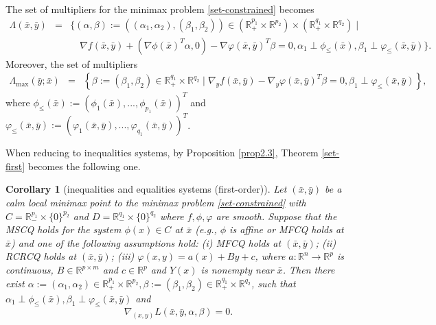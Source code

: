 \documentclass[11pt]{article}
\numberwithin{equation}{section}
\newtheorem{corollary}{Corollary}[section]
\begin{document}
{The set of multipliers for the minimax problem \eqref{set-constrained} becomes
\begin{eqnarray*}
 \Lambda(\bar x,\bar y) &=&  \{ (\alpha,\beta):=((\alpha_1,\alpha_2),(\beta_1,\beta_2)) \in (\mathbb{R}^{p_1}_+ \times \mathbb{R}^{p_2}) \times (\mathbb{R}^{q_1}_+ \times \mathbb{R}^{q_2}) \mid   \\
& & \quad \nabla f(\bar x,\bar y)+(\nabla \phi(\bar x)^T\alpha, 0)- \nabla \varphi(\bar x,\bar y)^T\beta=0, \alpha_1 \perp \phi_{\leq}(\bar x) ,\beta_1 \perp \varphi_{\leq}(\bar x,\bar y)  \}.
\end{eqnarray*}
Moreover, the set of multipliers
\begin{eqnarray*}
\Lambda_{\max}(\bar y; \bar x)&=& \left \{ \beta:=(\beta_1,\beta_2) \in \mathbb{R}^{q_1}_+ \times \mathbb{R}^{q_2} \mid \nabla_y f(\bar x,\bar y)- \nabla_y \varphi(\bar x,\bar y)^T\beta=0,  \beta_1 \perp \varphi_{\leq}(\bar x,\bar y) \right \},
\end{eqnarray*}
where $\phi_{\leq}(\bar x):=(\phi_1(\bar x), ... ,\phi_{p_1}(\bar x))^T$ and $\varphi_{\leq}(\bar x,\bar y):=(\varphi_1(\bar x,\bar y), ... ,\varphi_{q_1}(\bar x,\bar y))^T$.



	When reducing to inequalities systems, by Proposition \ref{prop2.3}, Theorem \ref{set-first} becomes the following one.

\begin{corollary}[inequalities and equalities systems (first-order)]\label{coro5.1}
Let $(\bar x, \bar y)$ be a calm local minimax point to the minimax problem \eqref{set-constrained} with  $C=\mathbb{R}^{p_1}_- \times \{0\}^{p_2}$ and $D=\mathbb{R}^{q_1}_- \times \{0\}^{q_2}$ where $f,\phi, \varphi$ are smooth. Suppose that  the MSCQ holds for the system $\phi(x)\in C$ at $\bar x$ (e.g., $\phi$ is affine or MFCQ holds at $\bar x$) and one of the following assumptions hold:  (i) MFCQ holds at $(\bar x,\bar y)$;  (ii) RCRCQ holds  at $(\bar x,\bar y)$; (iii) $\varphi(x, y)=a(x) + By + c$, where $a: \mathbb{R}^n \to \mathbb{R}^p$ is continuous, $B \in \mathbb{R}^{p \times m}$ and $c \in \mathbb{R}^p$ and $Y(x)$ is nonempty near $\bar x$. Then there exist 
$\alpha:=(\alpha_1,\alpha_2) \in \mathbb{R}^{p_1}_+ \times \mathbb{R}^{p_2},\beta:=(\beta_1,\beta_2) \in \mathbb{R}^{q_1}_+ \times \mathbb{R}^{q_2}$,  such that $\alpha_1 \perp \phi_{\leq}(\bar x), \beta_1 \perp \varphi_{\leq}(\bar x,\bar y)$ and 
\begin{equation*}
\nabla_{(x,y)} L(\bar x,\bar y,\alpha,\beta) =0.
\end{equation*} 
\end{corollary}

}
\end{document}
